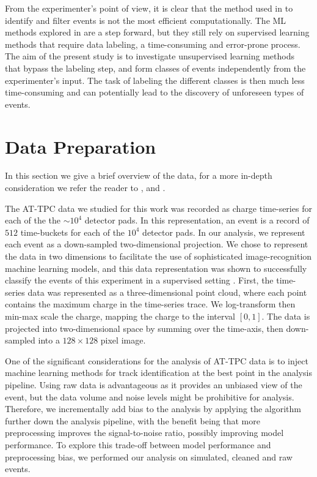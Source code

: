 \documentclass[review,number,sort&compress]{elsarticle}
\begin{document}
From the experimenter's point of view, it is clear that the method used in \cite{Bradt2018} to identify and filter events is not the most efficient computationally. The ML methods explored in \cite{Kuchera2019} are a step forward, but they still rely on supervised learning methods that require data labeling, a time-consuming and error-prone process. The aim of the present study is to investigate unsupervised learning methods that bypass the labeling step, and form classes of events independently from the experimenter's input. The task of labeling the different classes is then much less time-consuming and can potentially lead to the discovery of unforeseen types of events.

\section{Data Preparation}

In this section we give a brief overview of the data, for a more in-depth consideration we refer the reader to \cite{Mittig2015}, \cite{Suzuki2012} and  \cite{Bradt2017a}. 

The AT-TPC data we studied for this work was recorded as charge time-series for each of the  the $\sim10^4$ detector pads.
In this representation, an event is a record of $512$ time-buckets for each of the $10^4$ detector pads. In our analysis, we represent each event as a down-sampled two-dimensional  projection.
We chose to represent the data in two dimensions to facilitate the use of sophisticated image-recognition machine learning models, and this data representation was shown to successfully classify the events of this experiment in a supervised setting \cite{Kuchera2019}.
First, the time-series data was represented as a three-dimensional  point cloud, where each point contains the maximum charge in the time-series trace. We log-transform then min-max scale the charge, mapping the charge to the interval $[0, 1]$. The data is projected into two-dimensional  space by summing over the time-axis, then down-sampled into a $128\times128$ pixel image.

One of the significant considerations for the analysis of AT-TPC data is to inject machine learning methods for track identification at the best point in the analysis pipeline.
Using raw data is advantageous as it provides an unbiased view of the event, but the data volume and noise levels might be prohibitive for analysis.
Therefore, we incrementally add bias to the analysis by applying the algorithm further down the analysis pipeline, with the benefit being that more preprocessing improves the signal-to-noise ratio, possibly improving model performance.
To explore this trade-off between model performance and preprocessing bias, we performed our analysis on simulated, cleaned and raw events.
\end{document}
